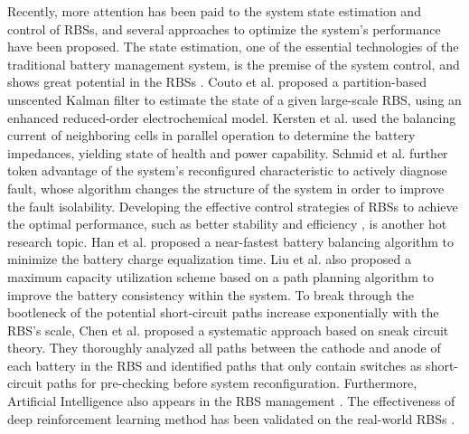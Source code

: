 \documentclass{article}
\begin{document}
Recently, more attention has been paid to the system state estimation and control of RBSs, and several approaches to optimize the system's performance have been proposed.
The state estimation, one of the essential technologies of the traditional battery management system, is the premise of the system control, and shows great potential in the RBSs \cite{komsiyskaCriticalReviewIntelligent2021}.
Couto et al. \cite{coutoPartitionbasedUnscentedKalman2018a} proposed a partition-based unscented Kalman filter to estimate the state of a given large-scale RBS, using an enhanced reduced-order electrochemical model.
Kersten et al. \cite{kerstenOnlineOnBoardBattery2020a} used the balancing current of neighboring cells in parallel operation to determine the battery impedances, yielding state of health and power capability.
Schmid et al. \cite{schmidActiveModelBasedFault2021a} further token advantage of the system's reconfigured characteristic to actively diagnose fault, whose algorithm changes the structure of the system in order to improve the fault isolability. 
Developing the effective control strategies of RBSs to achieve the optimal performance, such as better stability \cite{kacetlDesignAnalysisModular2023b} and efficiency \cite{yangAdaptiveControlFramework2022}, is another hot research topic.
Han et al. \cite{hanNearFastestBatteryBalancing2019a} proposed a near-fastest battery balancing algorithm to minimize the battery charge equalization time.
Liu et al. \cite{liuFlexiblePathPlanningbased2023a} also proposed a maximum capacity utilization scheme based on a path planning algorithm to improve the battery consistency within the system.
To break through the bootleneck of the potential short-circuit paths increase exponentially with the RBS's scale, Chen et al. \cite{chenSneakCircuitTheory2021} proposed a systematic approach based on sneak circuit theory. 
They thoroughly analyzed all paths between the cathode and anode of each battery in the RBS and identified paths that only contain switches as short-circuit paths for pre-checking before system reconfiguration. 
Furthermore, Artificial Intelligence also appears in the RBS management \cite{liuLongLifetimeBattery2022a}.
The effectiveness of deep reinforcement learning method has been validated on the real-world RBSs \cite{yangAdaptiveControlFramework2022}.
\end{document}
